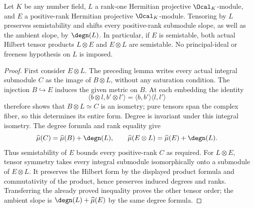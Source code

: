 \begin{lemma}
\label{lem:line-twist}
\leanok
Let $K$ be any number field, $L$ a rank-one Hermitian projective
$\Ocal_K$-module, and $E$ a positive-rank Hermitian projective
$\Ocal_K$-module. Tensoring by $L$ preserves semistability and shifts
every positive-rank submodule slope, as well as the ambient slope,
by $\degn(L)$. In particular, if $E$ is semistable, both actual
Hilbert tensor products $L\otimes E$ and $E\otimes L$ are semistable.
No principal-ideal or freeness hypothesis on $L$ is imposed.
\end{lemma}
\begin{proof}
First consider $E\otimes L$. The preceding lemma writes every actual
integral submodule $C$ as the image of $B\otimes L$, without any
saturation condition. The injection $B\hookrightarrow E$ induces
the given metric on $B$. At each embedding the identity
\[
 \langle b\otimes l,b'\otimes l'\rangle
 =\langle b,b'\rangle\langle l,l'\rangle
\]
therefore shows that $B\otimes L\simeq C$ is an isometry; pure
tensors span the complex fiber, so this determines its entire form.
Degree is invariant under this integral isometry. The degree formula
and rank equality give
\[
 \widehat\mu(C)=\widehat\mu(B)+\degn(L),\qquad
 \widehat\mu(E\otimes L)=\widehat\mu(E)+\degn(L).
\]
Thus semistability of $E$ bounds every positive-rank $C$ as required.
For $L\otimes E$, tensor symmetry takes every integral submodule
isomorphically onto a submodule of $E\otimes L$. It preserves the
Hilbert form by the displayed product formula and commutativity of
the product, hence preserves induced degrees and ranks. Transferring
the already proved inequality proves the other tensor order; the
ambient slope is $\degn(L)+\widehat\mu(E)$ by the same degree formula.
\end{proof}
